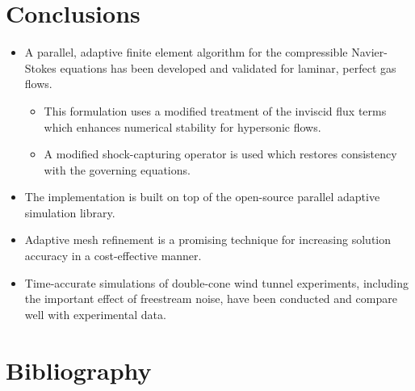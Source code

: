 \documentclass[compress,11pt]{beamer}
\begin{document}
\section{Conclusions}
\frame
{
  \begin{itemize}
    \item A parallel, adaptive finite element algorithm for the compressible Navier-Stokes equations has been developed and validated for laminar, perfect gas flows.
      \begin{itemize}
        \item This formulation uses a modified treatment of the inviscid flux terms which enhances numerical stability for hypersonic flows.
	\item A modified shock-capturing operator is used which restores consistency with the governing equations.
      \end{itemize}
    \item The  implementation is built on top of the \libMesh{} open-source parallel adaptive simulation library.
    \item Adaptive mesh refinement is a promising technique for increasing solution accuracy in a cost-effective manner.
    \item Time-accurate simulations of double-cone wind tunnel experiments, including the important effect of freestream noise, have been conducted and compare well with experimental data.
  \end{itemize}
}

\section*{Bibliography}
\begin{frame}[allowframebreaks]{}
  
  \vspace{-1em}
  \tiny
  
  \normalsize
\end{frame}
\end{document}
